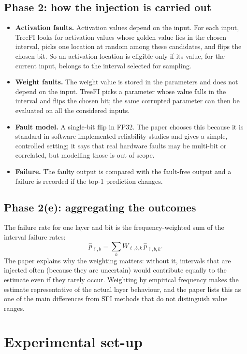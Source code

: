 \subsection{Phase 2: how the injection is carried out}
\begin{itemize}
\item \textbf{Activation faults.} Activation values depend on the input. For each input, TreeFI looks for activation values whose golden value lies in the chosen interval, picks one location at random among these candidates, and flips the chosen bit. So an activation location is eligible only if
 its value, for the current input, belongs to the interval selected for sampling.
\item \textbf{Weight faults.} The weight value is stored in the parameters and does not depend on the input. TreeFI picks a parameter whose value falls in the interval and flips the chosen bit; the same corrupted parameter can then be evaluated on all the considered inputs.
\item \textbf{Fault model.} A single-bit flip in FP32. The paper chooses this because it is standard in software-implemented reliability studies and gives a simple, controlled setting; it says that real hardware faults may be multi-bit or correlated, but modelling those is out of scope.
\item \textbf{Failure.} The faulty output is compared with the fault-free output and a failure is recorded if the top-1 prediction changes.
\end{itemize}

\subsection{Phase 2(e): aggregating the outcomes}
The failure rate for one layer and bit is the frequency-weighted sum of the interval failure rates:
\begin{equation}\label{eq:agg}
\hat p_{\ell,b}=\sum_k W_{\ell,b,k}\,\hat p_{\ell,b,k}.
\end{equation}
The paper explains why the weighting matters: without it, intervals that are injected often (because they are uncertain) would contribute equally to the estimate even if they rarely occur. Weighting by empirical frequency makes the estimate representative of the actual layer behaviour,
and the paper lists this as one of the main differences from SFI methods that do not distinguish value ranges.

\section{Experimental set-up}


